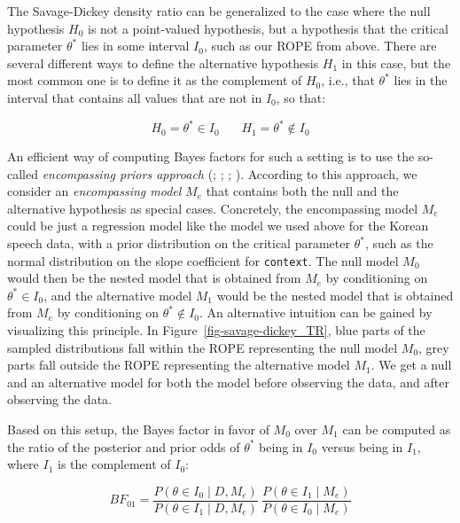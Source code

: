 \documentclass[
  doc,
  floatsintext,
  longtable,
  nolmodern,
  notxfonts,
  notimes,
  colorlinks=true,linkcolor=blue,citecolor=blue,urlcolor=blue]{apa7}
\begin{document}
The Savage-Dickey density ratio can be generalized to the case where the
null hypothesis \(H_0\) is not a point-valued hypothesis, but a
hypothesis that the critical parameter \(\theta^*\) lies in some
interval \(I_0\), such as our ROPE from above. There are several
different ways to define the alternative hypothesis \(H_1\) in this
case, but the most common one is to define it as the complement of
\(H_0\), i.e., that \(\theta^*\) lies in the interval that contains all
values that are not in \(I_0\), so that:

\[
H_0 = \theta^* \in I_0 \ \ \ \ \ \ \ \  H_1 = \theta^* \not \in I_0
\]

An efficient way of computing Bayes factors for such a setting is to use
the so-called \emph{encompassing priors approach}
(;
; ;
). According to this approach, we consider an \emph{encompassing
model} \(M_e\) that contains both the null and the alternative
hypothesis as special cases. Concretely, the encompassing model \(M_e\)
could be just a regression model like the model we used above for the
Korean speech data, with a prior distribution on the critical parameter
\(\theta^*\), such as the normal distribution on the slope coefficient
for \texttt{context}. The null model \(M_0\) would then be the nested
model that is obtained from \(M_e\) by conditioning on
\(\theta^* \in I_0\), and the alternative model \(M_1\) would be the
nested model that is obtained from \(M_e\) by conditioning on
\(\theta^* \not \in I_0\). An alternative intuition can be gained by
visualizing this principle. In Figure~\ref{fig-savage-dickey_TR}, blue
parts of the sampled distributions fall within the ROPE representing the
null model \(M_0\), grey parts fall outside the ROPE representing the
alternative model \(M_1\). We get a null and an alternative model for
both the model before observing the data, and after observing the data.

Based on this setup, the Bayes factor in favor of \(M_0\) over \(M_1\)
can be computed as the ratio of the posterior and prior odds of
\(\theta^*\) being in \(I_0\) versus being in \(I_1\), where \(I_1\) is
the complement of \(I_0\):

\[
BF_{01} = \frac{P(\theta \in I_{0} \mid D, M_{e})}{P(\theta \in I_{1} \mid D, M_{e})} \ \frac{P(\theta \in I_{1} \mid  M_{e})}{P(\theta \in I_{0} \mid M_{e})}
\]
\end{document}
